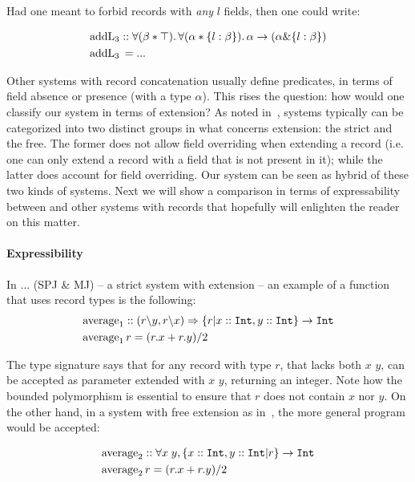 Had one meant to forbid records with \emph{any} $l$ fields, then one could write:

\begin{align*}
&\text{addL}_3 :: \forall (\beta * \top).\, \forall (\alpha * \{ l : \beta \}).\, 
\alpha \rightarrow (\alpha \& \{ l : \beta \}) \\
&\text{addL}_3 \, = ...
\end{align*}

Other systems with record concatenation usually define predicates, in terms of field absence or 
presence (with a type $\alpha$). 
This rises the question: how would one classify our system in terms of extension? 
As noted in~\cite{leijen2004first}, systems typically can be categorized into two distinct groups
in what concerns extension: the strict and the free.
The former does not allow field overriding when extending a record (i.e. one can only extend a 
record with a field that is not present in it); while the latter does account for field overriding.
Our system can be seen as hybrid of these two kinds of systems.
Next we will show a comparison in terms of expressability between \name and other systems 
with records that hopefully will enlighten the reader on this matter.

\paragraph{Expressibility}
In ... (SPJ \& MJ) -- a strict system with extension -- an example of a function that uses 
record types is the following:
\begin{align*}
&\text{average}_1 :: (r \backslash y, r \backslash x) \Rightarrow \{r | x :: \texttt{Int}, y :: \texttt{Int}\} \rightarrow \texttt{Int} \\
&\text{average}_1 \, r = (r.x + r.y) / 2
\end{align*}

The type signature says that for any record with type $r$, that lacks both $x$ $y$, can be accepted
as parameter extended with $x$ $y$, returning an integer.
Note how the bounded polymorphism is essential to ensure that $r$ does not contain $x$ nor $y$.
On the other hand, in a system with free extension as in~\cite{leijen2005extensible}, 
the more general program would be accepted:

\begin{align*}
&\text{average}_2 :: \forall x \; y, \{ x :: \texttt{Int}, y :: \texttt{Int} | r \} \rightarrow \texttt{Int} \\
&\text{average}_2 \, r = (r.x + r.y) / 2
\end{align*}

